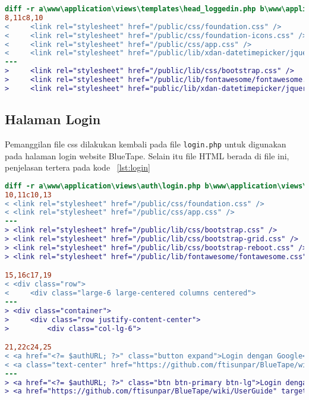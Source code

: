 \begin{lstlisting}[language=diff, caption=Perubahan file \path{\views\templates\head_loggedin.php},  basicstyle=\ttfamily, frame=single,
columns=fullflexible, keepspaces=true, breaklines=true, label={lst:headloggedin}]
diff -r a\www\application\views\templates\head_loggedin.php b\www\application\views\templates\head_loggedin.php
8,11c8,10
<     <link rel="stylesheet" href="/public/css/foundation.css" />
<     <link rel="stylesheet" href="/public/css/foundation-icons.css" />
<     <link rel="stylesheet" href="/public/css/app.css" />
<     <link rel="stylesheet" href="/public/lib/xdan-datetimepicker/jquery.datetimepicker.min.css" />
---
>     <link rel="stylesheet" href="/public/lib/css/bootstrap.css" />
>     <link rel="stylesheet" href="/public/lib/fontawesome/fontawesome.css">
>     <link rel="stylesheet" href="public/lib/xdan-datetimepicker/jquery.datetimepicker.min.css">

\end{lstlisting}

\subsection{Halaman Login}
Pemanggilan file css dilakukan kembali pada file \texttt{login.php} untuk digunakan pada halaman login website BlueTape. Selain itu file HTML berada di file ini, penjelasan tertera pada kode ~\ref{lst:login}
\begin{lstlisting}[language=diff, caption=Perubahan file \path{\views\auth\login.php},  basicstyle=\ttfamily, frame=single,
columns=fullflexible, keepspaces=true, breaklines=true, label={lst:login}]
diff -r a\www\application\views\auth\login.php b\www\application\views\auth\login.php
10,11c10,13
< <link rel="stylesheet" href="/public/css/foundation.css" />
< <link rel="stylesheet" href="/public/css/app.css" />
---
> <link rel="stylesheet" href="/public/lib/css/bootstrap.css" />
> <link rel="stylesheet" href="/public/lib/css/bootstrap-grid.css" />
> <link rel="stylesheet" href="/public/lib/css/bootstrap-reboot.css" />
> <link rel="stylesheet" href="/public/lib/fontawesome/fontawesome.css" />

15,16c17,19
< <div class="row">
<     <div class="large-6 large-centered columns centered">
---
> <div class="container">
>     <div class="row justify-content-center">
>         <div class="col-lg-6">

21,22c24,25
< <a href="<?= $authURL; ?>" class="button expand">Login dengan Google</a><br/><br/>
< <a class="text-center" href="https://github.com/ftisunpar/BlueTape/wiki/UserGuide" target="_blank">Petunjuk Penggunaan</a>
---
> <a href="<?= $authURL; ?>" class="btn btn-primary btn-lg">Login dengan Google</a><br/><br/>
> <a href="https://github.com/ftisunpar/BlueTape/wiki/UserGuide" target="_blank">Petunjuk Penggunaan</a>
\end{lstlisting}

